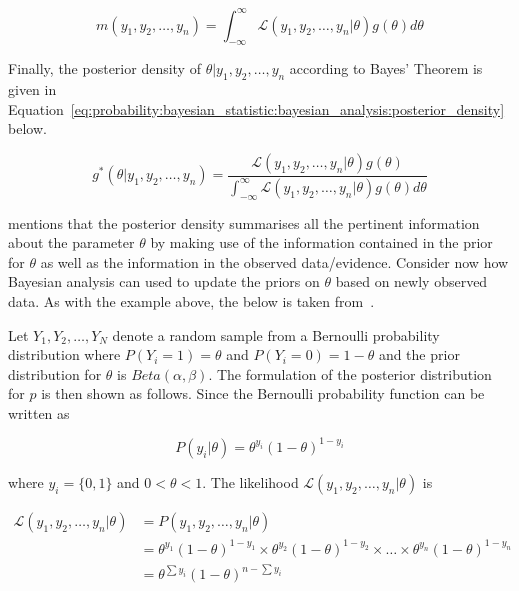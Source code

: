 \begin{equation}
      \label{eq:probability:bayesian_statistic:bayesian_analysis:marginal_density}
      m(y_{1}, y_{2}, \dots, y_{n}) = \int_{-\infty}^{\infty} \mathcal{L}(y_{1}, y_{2}, \dots, y_{n} \vert \theta)g(\theta)d\theta
\end{equation}

Finally, the posterior density of $\theta \vert y_{1}, y_{2}, \dots, y_{n}$ according to Bayes' Theorem is given in Equation~\eqref{eq:probability:bayesian_statistic:bayesian_analysis:posterior_density} below.

\begin{equation}
      \label{eq:probability:bayesian_statistic:bayesian_analysis:posterior_density}
      g^{*}(\theta \vert y_{1}, y_{2}, \dots, y_{n}) = \frac{\mathcal{L}(y_{1}, y_{2}, \dots, y_{n} \vert \theta)g(\theta)}{\int_{-\infty}^{\infty} \mathcal{L}(y_{1}, y_{2}, \dots, y_{n} \vert \theta)g(\theta)d\theta}
\end{equation}

\citeauthor{ref:wackerly:2014}\cite{ref:wackerly:2014} mentions that the posterior density summarises all the pertinent information about the parameter $\theta$ by making use of the information contained in the prior for $\theta$ as well as the information in the observed data/evidence. Consider now how Bayesian analysis can used to update the priors on $\theta$ based on newly observed data. As with the example above, the below is taken from~\cite{ref:wackerly:2014}.

Let $Y_{1}, Y_{2}, \dots, Y_{N}$ denote a random sample from a Bernoulli probability distribution where $P(Y_{i} = 1) = \theta$ and $P(Y_{i} = 0) = 1 - \theta$ and the prior distribution for $\theta$ is $Beta(\alpha, \beta)$. The formulation of the posterior distribution for $p$ is then shown as follows. Since the Bernoulli probability function can be written as

\begin{equation*}
      P(y_{i} \vert \theta) = \theta^{y_{i}}(1 - \theta)^{1-y_{i}}
\end{equation*}

where $y_{i} = \{0,1\}$ and $0 < \theta < 1$. The likelihood $\mathcal{L}(y_{1}, y_{2}, \dots, y_{n} \vert \theta)$ is

\begin{equation*}
      \begin{split}
            \mathcal{L}(y_{1}, y_{2}, \dots, y_{n} \vert \theta)
            &= P(y_{1}, y_{2}, \dots, y_{n} \vert \theta)\\
            &= \theta^{y_{1}}(1-\theta)^{1 - y_{1}} \times \theta^{y_{2}}(1-\theta)^{1 - y_{2}} \times \dots \times \theta^{y_{n}}(1-\theta)^{1 - y_{n}}\\
            &= \theta^{\sum y_{i}}(1-\theta)^{n-\sum y_{i}}
      \end{split}
\end{equation*}

